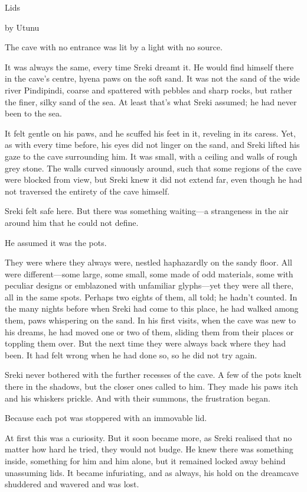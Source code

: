 Lids

by Utunu

The cave with no entrance was lit by a light with no source.

It was always the same, every time Sreki dreamt it. He would find himself there in the cave's centre, hyena paws on the soft sand. It was not the sand of the wide river Pindipindi, coarse and spattered with pebbles and sharp rocks, but rather the finer, silky sand of the sea. At least that's what Sreki assumed; he had never been to the sea.

It felt gentle on his paws, and he scuffed his feet in it, reveling in its caress. Yet, as with every time before, his eyes did not linger on the sand, and Sreki lifted his gaze to the cave surrounding him. It was small, with a ceiling and walls of rough grey stone. The walls curved sinuously around, such that some regions of the cave were blocked from view, but Sreki knew it did not extend far, even though he had not traversed the entirety of the cave himself.

Sreki felt safe here. But there was something waiting---a strangeness in the air around him that he could not define.

He assumed it was the pots.

They were where they always were, nestled haphazardly on the sandy floor. All were different---some large, some small, some made of odd materials, some with peculiar designs or emblazoned with unfamiliar glyphs---yet they were all there, all in the same spots. Perhaps two eights of them, all told; he hadn't counted. In the many nights before when Sreki had come to this place, he had walked among them, paws whispering on the sand. In his first visits, when the cave was new to his dreams, he had moved one or two of them, sliding them from their places or toppling them over. But the next time they were always back where they had been. It had felt wrong when he had done so, so he did not try again.

Sreki never bothered with the further recesses of the cave. A few of the pots knelt there in the shadows, but the closer ones called to him. They made his paws itch and his whiskers prickle. And with their summons, the frustration began.

Because each pot was stoppered with an immovable lid.

At first this was a curiosity. But it soon became more, as Sreki realised that no matter how hard he tried, they would not budge. He knew there was something inside, something for him and him alone, but it remained locked away behind unassuming lids. It became infuriating, and as always, his hold on the dreamcave shuddered and wavered and was lost.

